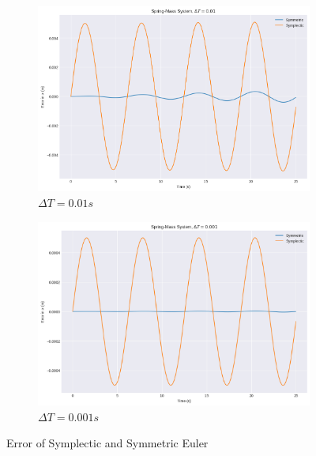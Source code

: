 \documentclass[11pt]{article}
\begin{document}
\begin{figure}[H]
    \centering
    \begin{subfigure}[H]{0.49\linewidth}
        \includegraphics[width=\linewidth]{../sm7.png}
        \caption*{$\Delta T = 0.01s$}
    \end{subfigure}
    \begin{subfigure}[H]{0.49\linewidth}
        \includegraphics[width=\linewidth]{../sm8.png}
        \caption*{$\Delta T = 0.001s$}
    \end{subfigure}
    \caption*{Error of Symplectic and Symmetric Euler}
    \end{figure}

    
\end{document}
